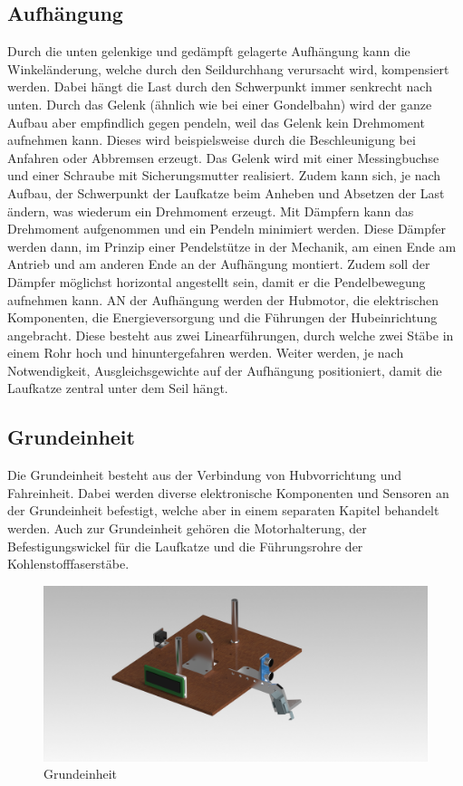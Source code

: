 \documentclass[a4paper]{report}
\begin{document}
\subsection{Aufhängung}
\label{ssec:Aufhaengung}
Durch die unten gelenkige und gedämpft gelagerte Aufhängung kann die Winkeländerung, welche durch den Seildurchhang verursacht wird, kompensiert werden. Dabei hängt die Last durch den Schwerpunkt immer senkrecht nach unten. Durch das Gelenk (ähnlich wie bei einer Gondelbahn) wird der ganze Aufbau aber empfindlich gegen pendeln, weil das Gelenk kein Drehmoment aufnehmen kann. Dieses wird beispielsweise durch die Beschleunigung bei Anfahren oder Abbremsen erzeugt. Das Gelenk wird mit einer Messingbuchse und einer Schraube mit Sicherungsmutter realisiert. Zudem kann sich, je nach Aufbau, der Schwerpunkt der Laufkatze beim Anheben und Absetzen der Last ändern, was wiederum ein Drehmoment erzeugt. Mit Dämpfern kann das Drehmoment aufgenommen und ein Pendeln minimiert werden. Diese Dämpfer werden dann, im Prinzip einer Pendelstütze in der Mechanik, am einen Ende am Antrieb und am anderen Ende an der Aufhängung montiert. Zudem soll der Dämpfer möglichst horizontal angestellt sein, damit er die Pendelbewegung aufnehmen kann. AN der Aufhängung werden der Hubmotor, die elektrischen Komponenten, die Energieversorgung und die Führungen der Hubeinrichtung angebracht. Diese besteht aus zwei Linearführungen, durch welche zwei Stäbe in einem Rohr hoch und hinuntergefahren werden. Weiter werden, je nach Notwendigkeit, Ausgleichsgewichte auf der Aufhängung positioniert, damit die Laufkatze zentral unter dem Seil hängt.



\subsection{Grundeinheit}
\label{ssec:GrundeinheitBeschrieb}
Die Grundeinheit besteht aus der Verbindung von Hubvorrichtung und Fahreinheit. Dabei werden diverse elektronische Komponenten und Sensoren an der Grundeinheit befestigt, welche aber in einem separaten Kapitel behandelt werden. Auch zur Grundeinheit gehören die Motorhalterung, der Befestigungswickel für die Laufkatze und die Führungsrohre der Kohlenstofffaserstäbe.

\begin{figure}[h!]
	\includegraphics[keepaspectratio,width=\textwidth]{Grundplatte}
	\caption{Grundeinheit}
	\label{fig:Grundeinheit}
\end{figure}
\end{document}
